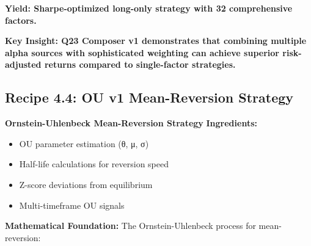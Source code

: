 \documentclass[11pt,letterpaper,openany]{book}
\begin{document}
\textbf{Yield: Sharpe-optimized long-only strategy with 32 comprehensive factors.}

\textbf{Key Insight: Q23 Composer v1 demonstrates that combining multiple alpha sources with sophisticated weighting can achieve superior risk-adjusted returns compared to single-factor strategies.}

\subsection{Recipe 4.4: OU v1 Mean-Reversion Strategy}

\textbf{Ornstein-Uhlenbeck Mean-Reversion Strategy}
\textbf{Ingredients:}
\begin{itemize}
    \item OU parameter estimation (θ, μ, σ)
    \item Half-life calculations for reversion speed
    \item Z-score deviations from equilibrium
    \item Multi-timeframe OU signals
\end{itemize}
\textbf{Mathematical Foundation:}
The Ornstein-Uhlenbeck process for mean-reversion:
\end{document}
